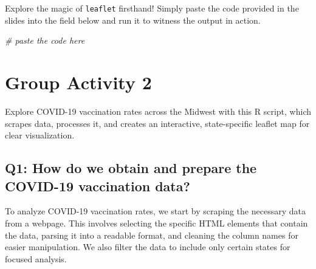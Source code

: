 \documentclass[
]{book}
\newenvironment{Shaded}{\begin{snugshade}}{\end{snugshade}}
\newcommand{\CommentTok}[1]{\textcolor[rgb]{0.56,0.35,0.01}{\textit{#1}}}
\begin{document}
Explore the magic of \texttt{leaflet} firsthand! Simply paste the code provided in the slides into the field below and run it to witness the output in action.

\begin{Shaded}
\begin{Highlighting}[]
\CommentTok{\# paste the code here}
\end{Highlighting}
\end{Shaded}

\hypertarget{group-activity-2-5}{%
\section{Group Activity 2}\label{group-activity-2-5}}

Explore COVID-19 vaccination rates across the Midwest with this R script, which scrapes data, processes it, and creates an interactive, state-specific leaflet map for clear visualization.

\hypertarget{q1-how-do-we-obtain-and-prepare-the-covid-19-vaccination-data}{%
\subsection{Q1: How do we obtain and prepare the COVID-19 vaccination data?}\label{q1-how-do-we-obtain-and-prepare-the-covid-19-vaccination-data}}

To analyze COVID-19 vaccination rates, we start by scraping the necessary data from a webpage. This involves selecting the specific HTML elements that contain the data, parsing it into a readable format, and cleaning the column names for easier manipulation. We also filter the data to include only certain states for focused analysis.
\end{document}

